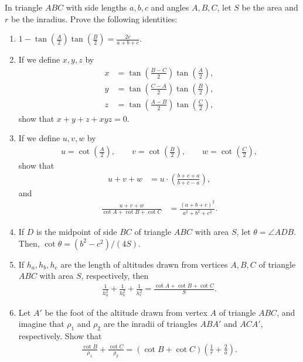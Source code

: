 \begin{tcolorbox}[title={Exercises in Law of Tangents}]
\begin{question}[name=Identities in Laws of Tangents \& Cotangents]
    In triangle $ABC$ with side lengths $a,b,c$ and angles $A,B,C$, let $S$ be the area and $r$ be the inradius. Prove the following identities:
    \begin{enumerate}
        \item $\displaystyle 1 - \tan\left(\frac{A}{2}\right)\tan\left(\frac{B}{2}\right)=\frac{2c}{a+b+c}$.
        \item If we define $x,y,z$ by
        \begin{align*}
            x &= \tan\left(\frac{B-C}{2}\right)\tan\left(\frac{A}{2}\right),\\
            y &= \tan\left(\frac{C-A}{2}\right)\tan\left(\frac{B}{2}\right),\\
            z &= \tan\left(\frac{A-B}{2}\right)\tan\left(\frac{C}{2}\right),
        \end{align*}
        show that $x+y+z+xyz=0$.
        \item If we define $u,v,w$ by
        \begin{align*}
            u=\cot\left(\frac{A}{2}\right), \qquad v=\cot\left(\frac{B}{2}\right), \qquad w=\cot\left(\frac{C}{2}\right),
        \end{align*}
        show that
        \begin{align*}
            u+v+w &=u\cdot \left(\frac{b+c+a}{b+c-a}\right),
        \end{align*}
        and
        \begin{align*}
            \frac{u+v+w}{\cot A + \cot B + \cot C} &= \frac{(a+b+c)^2}{a^2+b^2+c^2}.            
        \end{align*}
        \item If $D$ is the midpoint of side $BC$ of triangle $ABC$ with area $S$, let $\theta=\angle ADB$. Then, $\cot \theta = (b^2-c^2)/(4S)$.
        \item If $h_a,h_b,h_c$ are the length of altitudes drawn from vertices $A,B,C$ of triangle $ABC$ with area $S$, respectively, then
        \begin{align*}
            \frac{1}{h_a^2}+\frac{1}{h_b^2}+\frac{1}{h_c^2}=\frac{\cot A + \cot B + \cot C}{S}.
        \end{align*}
        \item Let $A'$ be the foot of the altitude drawn from vertex $A$ of triangle $ABC$, and imagine that $\rho_1$ and $\rho_2$ are the inradii of triangles $ABA'$ and $ACA'$, respectively. Show that
    \begin{align*}
        \frac{\cot B}{\rho_1} + \frac{\cot C}{\rho_2} = \left(\cot B + \cot C\right)\left(\frac 1r + \frac 2a\right).
    \end{align*}
    \end{enumerate}
\end{question}
\end{tcolorbox}



